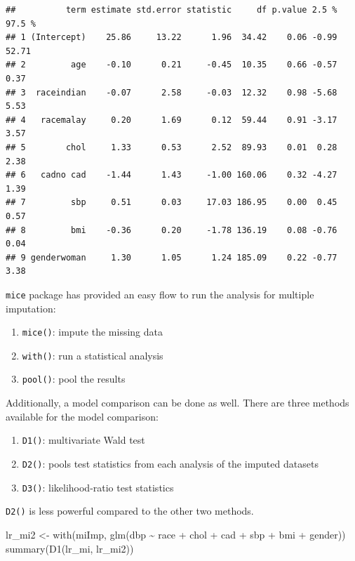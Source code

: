 \documentclass[
  10pt,
]{krantz}
\newenvironment{Shaded}{\begin{snugshade}}{\end{snugshade}}
\newcommand{\FunctionTok}[1]{\textcolor[rgb]{0.00,0.00,0.00}{#1}}
\newcommand{\NormalTok}[1]{#1}
\newcommand{\OtherTok}[1]{\textcolor[rgb]{0.56,0.35,0.01}{#1}}
\newcommand{\SpecialCharTok}[1]{\textcolor[rgb]{0.00,0.00,0.00}{#1}}
\providecommand{\tightlist}{%
  \setlength{\itemsep}{0pt}\setlength{\parskip}{0pt}}
\begin{document}
\begin{verbatim}
##          term estimate std.error statistic     df p.value 2.5 % 97.5 %
## 1 (Intercept)    25.86     13.22      1.96  34.42    0.06 -0.99  52.71
## 2         age    -0.10      0.21     -0.45  10.35    0.66 -0.57   0.37
## 3  raceindian    -0.07      2.58     -0.03  12.32    0.98 -5.68   5.53
## 4   racemalay     0.20      1.69      0.12  59.44    0.91 -3.17   3.57
## 5        chol     1.33      0.53      2.52  89.93    0.01  0.28   2.38
## 6   cadno cad    -1.44      1.43     -1.00 160.06    0.32 -4.27   1.39
## 7         sbp     0.51      0.03     17.03 186.95    0.00  0.45   0.57
## 8         bmi    -0.36      0.20     -1.78 136.19    0.08 -0.76   0.04
## 9 genderwoman     1.30      1.05      1.24 185.09    0.22 -0.77   3.38
\end{verbatim}

\texttt{mice} package has provided an easy flow to run the analysis for multiple imputation:

\begin{enumerate}
\def\labelenumi{\arabic{enumi}.}
\tightlist
\item
  \texttt{mice()}: impute the missing data
\item
  \texttt{with()}: run a statistical analysis
\item
  \texttt{pool()}: pool the results
\end{enumerate}

Additionally, a model comparison can be done as well. There are three methods available for the model comparison:

\begin{enumerate}
\def\labelenumi{\arabic{enumi}.}
\tightlist
\item
  \texttt{D1()}: multivariate Wald test
\item
  \texttt{D2()}: pools test statistics from each analysis of the imputed datasets
\item
  \texttt{D3()}: likelihood-ratio test statistics
\end{enumerate}

\texttt{D2()} is less powerful compared to the other two methods.

\begin{Shaded}
\begin{Highlighting}[]
\NormalTok{lr\_mi2 }\OtherTok{\textless{}{-}} \FunctionTok{with}\NormalTok{(miImp, }\FunctionTok{glm}\NormalTok{(dbp }\SpecialCharTok{\textasciitilde{}}\NormalTok{ race }\SpecialCharTok{+}\NormalTok{ chol }\SpecialCharTok{+}\NormalTok{ cad }\SpecialCharTok{+}\NormalTok{ sbp }\SpecialCharTok{+}\NormalTok{ bmi }\SpecialCharTok{+}\NormalTok{ gender))}
\FunctionTok{summary}\NormalTok{(}\FunctionTok{D1}\NormalTok{(lr\_mi, lr\_mi2))}
\end{Highlighting}
\end{Shaded}
\end{document}
